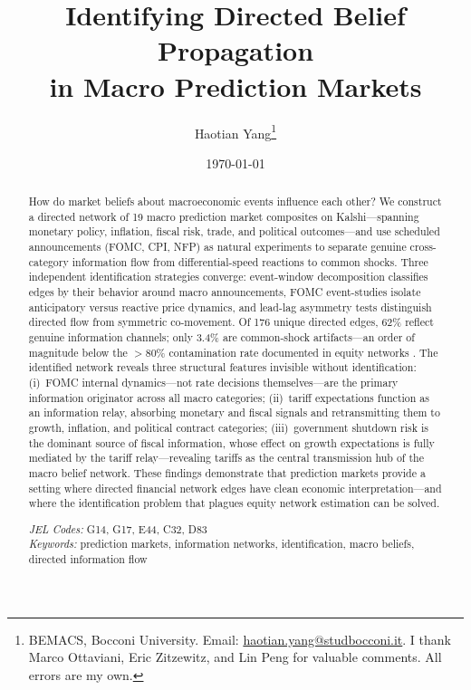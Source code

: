 \documentclass[12pt,letterpaper]{article}
\title{\textbf{Identifying Directed Belief Propagation\\in Macro Prediction Markets}}
\author{Haotian Yang\thanks{BEMACS, Bocconi University. Email: \href{mailto:haotian.yang@studbocconi.it}{haotian.yang@studbocconi.it}. I thank Marco Ottaviani, Eric Zitzewitz, and Lin Peng for valuable comments. All errors are my own.}}
\date{\today}
\begin{document}
\maketitle
\thispagestyle{empty}


\begin{abstract}
\noindent How do market beliefs about macroeconomic events influence each other? We construct a directed network of 19 macro prediction market composites on Kalshi---spanning monetary policy, inflation, fiscal risk, trade, and political outcomes---and use scheduled announcements (FOMC, CPI, NFP) as natural experiments to separate genuine cross-category information flow from differential-speed reactions to common shocks. Three independent identification strategies converge: event-window decomposition classifies edges by their behavior around macro announcements, FOMC event-studies isolate anticipatory versus reactive price dynamics, and lead-lag asymmetry tests distinguish directed flow from symmetric co-movement. Of 176 unique directed edges, 62\% reflect genuine information channels; only 3.4\% are common-shock artifacts---an order of magnitude below the $>$80\% contamination rate documented in equity networks \citep{yang2026te}. The identified network reveals three structural features invisible without identification: (i)~FOMC internal dynamics---not rate decisions themselves---are the primary information originator across all macro categories; (ii)~tariff expectations function as an information relay, absorbing monetary and fiscal signals and retransmitting them to growth, inflation, and political contract categories; (iii)~government shutdown risk is the dominant source of fiscal information, whose effect on growth expectations is fully mediated by the tariff relay---revealing tariffs as the central transmission hub of the macro belief network. These findings demonstrate that prediction markets provide a setting where directed financial network edges have clean economic interpretation---and where the identification problem that plagues equity network estimation can be solved.

\medskip
\noindent\textit{JEL Codes:} G14, G17, E44, C32, D83\\
\textit{Keywords:} prediction markets, information networks, identification, macro beliefs, directed information flow
\end{abstract}
\end{document}
